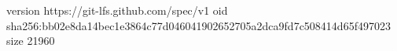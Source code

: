 version https://git-lfs.github.com/spec/v1
oid sha256:bb02e8da14bec1e3864c77d046041902652705a2dca9fd7c508414d65f497023
size 21960

